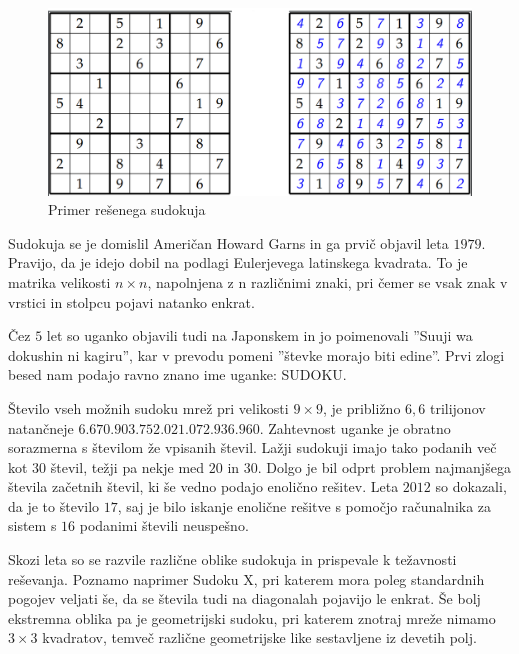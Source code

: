 \documentclass[A4paper, 11pt]{article}
\begin{document}
\begin{figure}[h]
\centering
\caption{Primer rešenega sudokuja}
\includegraphics[scale=0.4]{sudoku_resen}
\end{figure}

\pagebreak

Sudokuja se je domislil Američan Howard Garns in ga prvič objavil leta $1979$. Pravijo, da je idejo dobil na podlagi Eulerjevega latinskega kvadrata. To je matrika velikosti $n \times n$, napolnjena z n različnimi znaki, pri čemer se vsak znak v vrstici in stolpcu pojavi natanko enkrat.

Čez $5$ let so uganko objavili tudi na Japonskem in jo poimenovali ''Suuji wa dokushin ni kagiru'', kar v prevodu pomeni ''števke morajo biti edine''. Prvi zlogi besed nam podajo ravno znano ime uganke: SUDOKU.

Število vseh možnih sudoku mrež pri velikosti $9\times9$, je približno $6,6$ trilijonov natančneje $6.670.903.752.021.072.936.960$. Zahtevnost uganke je obratno sorazmerna s številom že vpisanih števil. Lažji sudokuji imajo tako podanih več kot $30$ števil, težji pa nekje med $20$ in $30$. Dolgo je bil odprt problem najmanjšega števila začetnih števil, ki še vedno podajo enolično rešitev. Leta $2012$ so dokazali, da je to število $17$, saj je bilo iskanje enolične rešitve s pomočjo računalnika za sistem s $16$ podanimi števili neuspešno.

Skozi leta so se razvile različne oblike sudokuja in prispevale k težavnosti reševanja. Poznamo naprimer Sudoku X, pri katerem mora poleg standardnih pogojev veljati še, da se števila tudi na diagonalah pojavijo le enkrat. Še bolj ekstremna oblika pa je geometrijski sudoku, pri katerem znotraj mreže nimamo $3\times3$ kvadratov, temveč različne geometrijske like sestavljene iz devetih polj.
\end{document}
